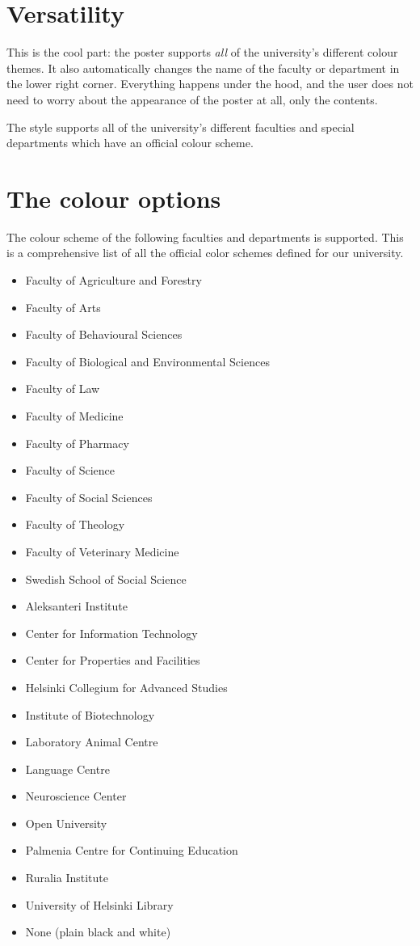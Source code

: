 \documentclass[a0paper,smallertitle]{HYposter}
\begin{document}
\section*{Versatility}
This is the cool part: the poster supports \emph{all} of the university's different colour themes. It also automatically changes the name of the faculty or department in the lower right corner. Everything happens under the hood, and the user does not need to worry about the appearance of the poster at all, only the contents.

The style supports all of the university's different faculties and special departments which have an official colour scheme.


\section*{The colour options}

The colour scheme of the following faculties and departments is supported. This is a comprehensive list of all the official color schemes defined for our university.

\begin{itemize}
    \item Faculty of Agriculture and Forestry 
    \item Faculty of Arts 
    \item Faculty of Behavioural Sciences 
    \item Faculty of Biological and Environmental Sciences 
    \item Faculty of Law 
    \item Faculty of Medicine 
    \item Faculty of Pharmacy 
    \item Faculty of Science 
    \item Faculty of Social Sciences 
    \item Faculty of Theology 
    \item Faculty of Veterinary Medicine 
    \item Swedish School of Social Science
    \item Aleksanteri Institute
    \item Center for Information Technology
    \item Center for Properties and Facilities
    \item Helsinki Collegium for Advanced Studies
    \item Institute of Biotechnology
    \item Laboratory Animal Centre
    \item Language Centre
    \item Neuroscience Center
    \item Open University
    \item Palmenia Centre for Continuing Education
    \item Ruralia Institute
    \item University of Helsinki Library
    \item None (plain black and white)
\end{itemize}
\end{document}
